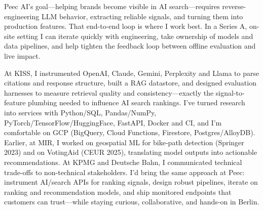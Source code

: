Peec AI’s goal—helping brands become visible in AI search—requires reverse-engineering LLM behavior, extracting reliable signals, and turning them into production features. That end-to-end loop is where I work best. In a Series A, on-site setting I can iterate quickly with engineering, take ownership of models and data pipelines, and help tighten the feedback loop between offline evaluation and live impact.

At KISS, I instrumented OpenAI, Claude, Gemini, Perplexity and Llama to parse citations and response structure, built a RAG datastore, and designed evaluation harnesses to measure retrieval quality and consistency—exactly the signal-to-feature plumbing needed to influence AI search rankings. I’ve turned research into services with Python/SQL, Pandas/NumPy, PyTorch/TensorFlow/HuggingFace, FastAPI, Docker and CI, and I’m comfortable on GCP (BigQuery, Cloud Functions, Firestore, Postgres/AlloyDB). Earlier, at MIR, I worked on geospatial ML for bike‑path detection (Springer 2023) and on VotingAid (CEUR 2025), translating model outputs into actionable recommendations. At KPMG and Deutsche Bahn, I communicated technical trade-offs to non-technical stakeholders. I’d bring the same approach at Peec: instrument AI/search APIs for ranking signals, design robust pipelines, iterate on ranking and recommendation models, and ship monitored endpoints that customers can trust—while staying curious, collaborative, and hands-on in Berlin.